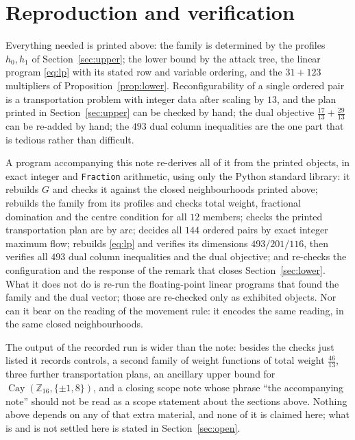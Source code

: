 \documentclass[11pt]{amsart}
\theoremstyle{remark}
\newcommand{\Z}{\mathbb{Z}}
\newcommand{\Cay}{\operatorname{Cay}}
\begin{document}
\section{Reproduction and verification}

Everything needed is printed above: the family is determined by the profiles
$h_0,h_1$ of Section~\ref{sec:upper}; the lower bound by the attack tree, the
linear program \eqref{eq:lp} with its stated row and variable ordering, and the
$31+123$ multipliers of Proposition~\ref{prop:lower}. Reconfigurability of a
single ordered pair is a transportation problem with integer data after scaling
by $13$, and the plan printed in Section~\ref{sec:upper} can be checked by
hand; the dual objective $\tfrac{17}{13}+\tfrac{29}{13}$ can be re-added by
hand; the $493$ dual column inequalities are the one part that is tedious
rather than difficult.

A program accompanying this note re-derives all of it from the printed objects,
in exact integer and \texttt{Fraction} arithmetic, using only the Python
standard library: it rebuilds $G$ and checks it against the closed
neighbourhoods printed above; rebuilds the family from its profiles and checks
total weight, fractional domination and the centre condition for all $12$
members; checks the printed transportation plan arc by arc; decides all $144$
ordered pairs by exact integer maximum flow; rebuilds \eqref{eq:lp} and
verifies its dimensions $493/201/116$, then verifies all $493$ dual column
inequalities and the dual objective; and re-checks the configuration and the
response of the remark that closes Section~\ref{sec:lower}. What it does not do
is re-run the floating-point linear programs that found the family and the dual
vector; those are re-checked only as exhibited objects. Nor can it bear on the
reading of the movement rule: it encodes the same reading, in the same closed
neighbourhoods.

The output of the recorded run is wider than the note: besides the checks just
listed it records controls, a second family of weight functions of total weight
$\tfrac{46}{13}$, three further transportation plans, an ancillary upper bound
for $\Cay(\Z_{16},\{\pm1,8\})$, and a closing scope note whose phrase ``the
accompanying note'' should not be read as a scope statement about the sections
above. Nothing above depends on any of that extra material, and none of it is
claimed here; what is and is not settled here is stated in
Section~\ref{sec:open}.
\end{document}
